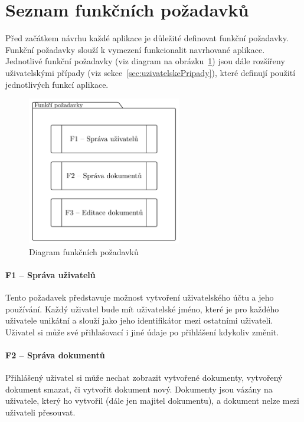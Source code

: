
\section{Seznam funkčních požadavků}\label{sec:seznamFunkčníchPožadavků}

Před začátkem návrhu každé aplikace je důležité definovat funkční požadavky.
Funkční požadavky slouží k vymezení funkcionalit navrhované aplikace.
Jednotlivé funkční požadavky (viz diagram na obrázku~\ref{fig:funkciPozadavky}) jsou dále rozšířeny uživatelskými případy (viz sekce~\ref{sec:uzivatelskePripady}), které definují použití jednotlivých funkcí aplikace.

\begin{figure}[ht!]
    \centering
    \includegraphics[width=0.6\textwidth]{partials/analyza/funkcniPozadavky.pdf}
    \caption{Diagram funkčních požadavků}\label{fig:funkciPozadavky}
\end{figure}

\paragraph{F1 -- Správa uživatelů}

Tento požadavek představuje možnost vytvoření uživatelského účtu a jeho používání.
Každý uživatel bude mít uživatelské jméno, které je pro každého uživatele unikátní a slouží jako jeho identifikátor mezi ostatními uživateli.
Uživatel si může své přihlašovací i jiné údaje po přihlášení kdykoliv změnit.

\paragraph{F2 -- Správa dokumentů}

Přihlášený uživatel si může nechat zobrazit vytvořené dokumenty, vytvořený dokument smazat, či vytvořit dokument nový.
Dokumenty jsou vázány na uživatele, který ho vytvořil (dále jen majitel dokumentu), a dokument nelze mezi uživateli přesouvat.

